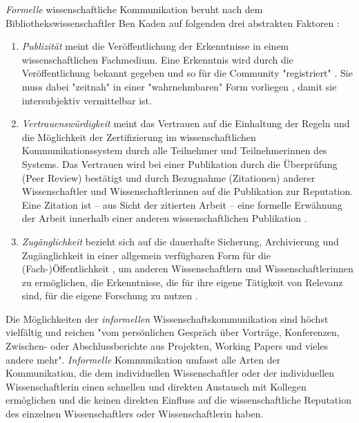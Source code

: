 \textit{Formelle} wissenschaftliche Kommunikation beruht nach dem Bibliothekswissenschaftler Ben Kaden auf folgenden drei abstrakten Faktoren \cite{kaden_2009_library}:
\begin{enumerate}
\item \textit{Publizität} meint die Veröffentlichung der Erkenntnisse in einem wissenschaftlichen Fachmedium. Eine Erkenntnis wird durch die Veröffentlichung bekannt gegeben und so für die Community "registriert" \cite{kaden_2009_library} \cite[:5]{seidenfaden_2005_kommunikation}. Sie muss dabei "zeitnah" in einer "wahrnehmbaren" Form vorliegen \cite{Schimank_2012}, damit sie intersubjektiv vermittelbar ist.
\item \textit{Vertrauenswürdigkeit} meint das Vertrauen auf die Einhaltung der Regeln und die Möglichkeit der Zertifizierung \cite[:6]{seidenfaden_2005_kommunikation} im wissenschaftlichen Kommunikationssystem durch alle Teilnehmer und Teilnehmerinnen des Systems. Das Vertrauen wird bei einer Publikation durch die Überprüfung (Peer Review) bestätigt und durch Bezugnahme (Zitationen) anderer Wissenschaftler und Wissenschaftlerinnen auf die Publikation zur Reputation. Eine Zitation ist – aus Sicht der zitierten Arbeit – eine formelle Erwähnung der Arbeit innerhalb einer anderen wissenschaftlichen Publikation \cite{weller2011twitter}.
\item \textit{Zugänglichkeit} bezieht sich auf die dauerhafte Sicherung, Archivierung \cite[:6]{seidenfaden_2005_kommunikation} und Zugänglichkeit in einer allgemein verfügbaren Form für die (Fach-)Öffentlichkeit \cite{naeder_2010_open}, um anderen Wissenschaftlern und Wissenschaftlerinnen zu ermöglichen, die Erkenntnisse, die für ihre eigene Tätigkeit von Relevanz sind, für die eigene Forschung zu nutzen \cite[:6]{seidenfaden_2005_kommunikation}.
\end{enumerate}

Die Möglichkeiten der \textit{informellen} Wissenschaftskommunikation sind höchst vielfältig und reichen "vom persönlichen Gespräch über Vorträge, Konferenzen, Zwischen- oder Abschlussberichte aus Projekten, Working Papers und vieles andere mehr"\cite{Hanekop_2014}. \textit{Informelle} Kommunikation umfasst alle Arten der Kommunikation, die dem individuellen Wissenschaftler oder der individuellen Wissenschaftlerin einen schnellen und direkten Austausch mit Kollegen ermöglichen und die keinen direkten Einfluss auf die wissenschaftliche Reputation des einzelnen Wissenschaftlers oder Wissenschaftlerin haben.

